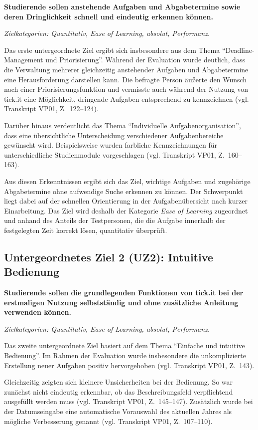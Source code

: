 \textbf{Studierende sollen anstehende Aufgaben und Abgabetermine sowie deren Dringlichkeit schnell und eindeutig erkennen können.}

\textit{Zielkategorien: Quantitativ, Ease of Learning, absolut, Performanz.}

Das erste untergeordnete Ziel ergibt sich insbesondere aus dem Thema \enquote{Deadline-Management und Priorisierung}.
Während der Evaluation wurde deutlich, dass die Verwaltung mehrerer gleichzeitig anstehender Aufgaben und Abgabetermine eine Herausforderung darstellen kann.
Die befragte Person äußerte den Wunsch nach einer Priorisierungsfunktion und vermisste auch während der Nutzung von tick.it eine Möglichkeit, dringende Aufgaben entsprechend zu kennzeichnen (vgl. Transkript VP01, Z.~122--124).

Darüber hinaus verdeutlicht das Thema \enquote{Individuelle Aufgabenorganisation}, dass eine übersichtliche Unterscheidung verschiedener Aufgabenbereiche gewünscht wird.
Beispielsweise wurden farbliche Kennzeichnungen für unterschiedliche Studienmodule vorgeschlagen (vgl. Transkript VP01, Z.~160--163).

Aus diesen Erkenntnissen ergibt sich das Ziel, wichtige Aufgaben und zugehörige Abgabetermine ohne aufwendige Suche erkennen zu können.
Der Schwerpunkt liegt dabei auf der schnellen Orientierung in der Aufgabenübersicht nach kurzer Einarbeitung.
Das Ziel wird deshalb der Kategorie \textit{Ease of Learning} zugeordnet und anhand des Anteils der Testpersonen, die die Aufgabe innerhalb der festgelegten Zeit korrekt lösen, quantitativ überprüft.

\subsection*{Untergeordnetes Ziel 2 (UZ2): Intuitive Bedienung}

\textbf{Studierende sollen die grundlegenden Funktionen von tick.it bei der erstmaligen Nutzung selbstständig und ohne zusätzliche Anleitung verwenden können.}

\textit{Zielkategorien: Quantitativ, Ease of Learning, absolut, Performanz.}

Das zweite untergeordnete Ziel basiert auf dem Thema \enquote{Einfache und intuitive Bedienung}.
Im Rahmen der Evaluation wurde insbesondere die unkomplizierte Erstellung neuer Aufgaben positiv hervorgehoben (vgl. Transkript VP01, Z.~143).

Gleichzeitig zeigten sich kleinere Unsicherheiten bei der Bedienung.
So war zunächst nicht eindeutig erkennbar, ob das Beschreibungsfeld verpflichtend ausgefüllt werden muss (vgl. Transkript VP01, Z.~145--147).
Zusätzlich wurde bei der Datumseingabe eine automatische Vorauswahl des aktuellen Jahres als mögliche Verbesserung genannt (vgl. Transkript VP01, Z.~107--110).

